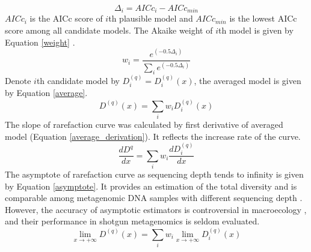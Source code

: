 \documentclass[11pt]{article}
\begin{document}
      \begin{equation}
        \Delta_i = AICc_i-AICc_{min}
        \label{Delta}
      \end{equation}
      $AICc_i$ is the AICc score of $i$th plausible model and $AICc_{min}$ is the lowest AICc score among all candidate models. 
      The Akaike weight of $i$th model is given by Equation \ref{weight} \citep{anderson2007model}.
      \begin{equation}
        w_i = \frac{e^{(-0.5\Delta_i)}}{\sum_{i}e^{(-0.5\Delta_i)}}
        \label{weight}
      \end{equation}
      Denote $i$th candidate model by $D^{(q)}_i = D^{(q)}_i(x)$, the averaged model is given by Equation \ref{average}.
      \begin{equation}
        D^{(q)}(x) = \sum_{i}w_iD^{(q)}_i(x)
        \label{average}
      \end{equation}
      The slope of rarefaction curve was calculated by first derivative of averaged model (Equation \ref{average_derivation}). 
      It reflects the increase rate of the curve.
      \begin{equation}
        \frac{dD^{q}}{dx} = \sum_{i}w_i\frac{dD^{(q)}_i}{dx}
        \label{average_derivation}
      \end{equation}
      The asymptote of rarefaction curve as sequencing depth tends to infinity is given by Equation \ref{asymptote}. 
      It provides an estimation of the total diversity and is comparable among metagenomic DNA samples with different sequencing depth \citep{lamas1991preliminary,soberonm1993use,hortal2004butterfly,jimenez2005determining,hortal2006evaluating}. 
      However, the accuracy of asymptotic estimators is controversial in macroecology \citep{soberonm1993use,colwell1994estimating,chazdon1998statistical,jimenez2006comparing,hortal2006evaluating}, and their performance in shotgun metagenomics is seldom evaluated.
      \begin{equation}
        \lim_{x \to +\infty}D^{(q)}(x) = \sum_{i}w_i\lim_{x \to +\infty}D^{(q)}_i(x)
        \label{asymptote}
      \end{equation}
\end{document}
